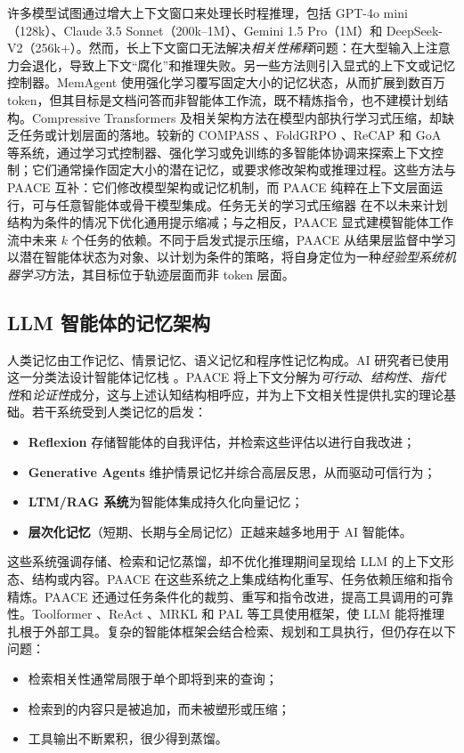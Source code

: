\documentclass[10pt,twocolumn]{article}
\begin{document}
许多模型试图通过增大上下文窗口来处理长时程推理，包括 GPT-4o mini（128k）、Claude 3.5 Sonnet（200k--1M）、Gemini 1.5 Pro（1M）和 DeepSeek-V2（256k+）。然而，长上下文窗口无法解决\emph{相关性稀释}问题：在大型输入上注意力会退化，导致上下文“腐化”和推理失败。另一些方法则引入显式的上下文或记忆控制器。MemAgent \citep{yu2025memagent} 使用强化学习覆写固定大小的记忆状态，从而扩展到数百万 token，但其目标是文档问答而非智能体工作流，既不精炼指令，也不建模计划结构。Compressive Transformers \citep{rae2020compressive} 及相关架构方法在模型内部执行学习式压缩，却缺乏任务或计划层面的落地。较新的 COMPASS \citep{li2024compass}、FoldGRPO \citep{sun2025foldgrpo}、ReCAP \citep{zhang2025recap} 和 GoA \citep{joo2025goa} 等系统，通过学习式控制器、强化学习或免训练的多智能体协调来探索上下文控制；它们通常操作固定大小的潜在记忆，或要求修改架构或推理过程。这些方法与 PAACE 互补：它们修改模型架构或记忆机制，而 PAACE 纯粹在上下文层面运行，可与任意智能体或骨干模型集成。任务无关的学习式压缩器 \citep{sun2023promptcompression} 在不以未来计划结构为条件的情况下优化通用提示缩减；与之相反，PAACE 显式建模智能体工作流中未来 $k$ 个任务的依赖。不同于启发式提示压缩，PAACE 从结果层监督中学习以潜在智能体状态为对象、以计划为条件的策略，将自身定位为一种\emph{经验型系统机器学习}方法，其目标位于轨迹层面而非 token 层面。

\subsection{LLM 智能体的记忆架构}

人类记忆由工作记忆、情景记忆、语义记忆和程序性记忆构成。AI 研究者已使用这一分类法设计智能体记忆栈 \citep{park2023generative,shinn2023reflexion}。PAACE 将上下文分解为\emph{可行动}、\emph{结构性}、\emph{指代性}和\emph{论证性}成分，这与上述认知结构相呼应，并为上下文相关性提供扎实的理论基础。若干系统受到人类记忆的启发：
\begin{itemize}
  \item \textbf{Reflexion} \citep{shinn2023reflexion} 存储智能体的自我评估，并检索这些评估以进行自我改进；
  \item \textbf{Generative Agents} \citep{park2023generative} 维护情景记忆并综合高层反思，从而驱动可信行为；
  \item \textbf{LTM/RAG 系统}为智能体集成持久化向量记忆；
  \item \textbf{层次化记忆}（短期、长期与全局记忆）正越来越多地用于 AI 智能体。
\end{itemize}

这些系统强调存储、检索和记忆蒸馏，却不优化推理期间呈现给 LLM 的上下文形态、结构或内容。PAACE 在这些系统之上集成结构化重写、任务依赖压缩和指令精炼。PAACE 还通过任务条件化的裁剪、重写和指令改进，提高工具调用的可靠性。Toolformer \citep{schick2023toolformer}、ReAct \citep{yao2023react}、MRKL \citep{mrkl2022} 和 PAL \citep{gao2023pal} 等工具使用框架，使 LLM 能将推理扎根于外部工具。复杂的智能体框架会结合检索、规划和工具执行，但仍存在以下问题：
\begin{itemize}
  \item 检索相关性通常局限于单个即将到来的查询；
  \item 检索到的内容只是被追加，而未被塑形或压缩；
  \item 工具输出不断累积，很少得到蒸馏。
\end{itemize}
\end{document}
